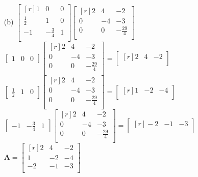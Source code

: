 \documentclass[letterpaper,fleqn,leqno]{article}
\begin{document}
{{\begin{enumerate}
				\item [(b)]
				$\begin{bmatrix*}[r]
					1 & 0 & 0 \\
					\frac{1}{2} & 1 & 0 \\
					-1 & -\frac{3}{4} & 1 \\
				\end{bmatrix*}
				\begin{bmatrix*}[r]
					2 & 4 & -2 \\
					0 & -4 & -3 \\
					0 & 0 & -\frac{29}{4} \\
				\end{bmatrix*}$ \\
				$\begin{bmatrix*} 1 & 0 & 0 \end{bmatrix*}
				\begin{bmatrix*}[r]
					2 & 4 & -2 \\
					0 & -4 & -3 \\
					0 & 0 & -\frac{29}{4} \\
				\end{bmatrix*}=
				\begin{bmatrix*}[r]
					2 & 4 & -2 \\
				\end{bmatrix*}$ \\
				$\begin{bmatrix*} \frac{1}{2} & 1 & 0 \end{bmatrix*}
				\begin{bmatrix*}[r]
					2 & 4 & -2 \\
					0 & -4 & -3 \\
					0 & 0 & -\frac{29}{4} \\
				\end{bmatrix*}=
				\begin{bmatrix*}[r]
					1 & -2 & -4 \\
				\end{bmatrix*}$ \\
				$\begin{bmatrix*} -1 & -\frac{3}{4} & 1 \end{bmatrix*}
				\begin{bmatrix*}[r]
					2 & 4 & -2 \\
					0 & -4 & -3 \\
					0 & 0 & -\frac{29}{4} \\
				\end{bmatrix*}=
				\begin{bmatrix*}[r]
					-2 & -1 & -3 \\
				\end{bmatrix*}$ \\
				$\textbf{A}=\begin{bmatrix*}[r]
					2 & 4 & -2 \\
					1 & -2 & -4 \\
					-2 & -1 & -3 \\
				\end{bmatrix*}$
			\end{enumerate}
		}
	}
\end{document}
